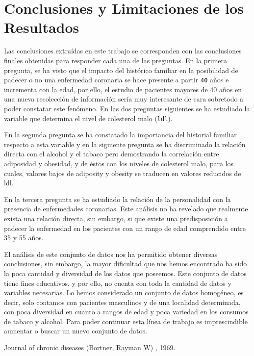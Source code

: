 \documentclass[a4paper, 9pt]{article}
\begin{document}
\vspace{5mm}

\section{Conclusiones y Limitaciones de los Resultados}

Las conclusiones extraídas en este trabajo se corresponden con las conclusiones finales obtenidas para responder cada una de las preguntas. En la primera pregunta, se ha visto que el impacto del histórico familiar en la posibilidad de padecer o no una enfermedad coronaria se hace presente a partir \texttt{40} años e incrementa con la edad, por ello, el estudio de pacientes mayores de 40 años en una nueva recolección de información sería muy interesante de cara sobretodo a poder constatar este fenómeno. En las dos preguntas siguientes se ha estudiado la variable que determina el nivel de colesterol malo (\texttt{ldl}). 

\vspace{3mm}

En la segunda pregunta se ha constatado la importancia del historial familiar respecto a esta variable y en la siguiente pregunta se ha discriminado la relación directa con el alcohol y el tabaco pero demostrando la correlación entre adiposidad y obesidad, y de éstos con los niveles de colesterol malo, para los cuales, valores bajos de adiposity y obesity se traducen en valores reducidos de ldl. 

\vspace{3mm}

En la tercera pregunta se ha estudiado la relación de la personalidad con la presencia de enfermedades coronarias. Este análisis no ha revelado que realmente exista una relación directa, sin embargo, si que existe una predisposición a padecer la enfermedad en los pacientes con un rango de edad comprendido entre 35 y 55 años.

\vspace{3mm}

El análisis de este conjunto de datos nos ha permitido obtener diversas conclusiones, sin embargo, la mayor dificultad que nos hemos encontrado ha sido la poca cantidad y diversidad de los datos que poseemos. Este conjunto de datos tiene fines educativos, y por ello, no cuenta con toda la cantidad de datos y variables necesarias. Lo hemos considerado un conjunto de datos homogéneo, es decir, solo contamos con pacientes masculinos y de una localidad determinada, con poca diversidad en cuanto a rangos de edad y poca variedad en los consumos de tabaco y alcohol. Para poder continuar esta línea de trabajo es imprescindible aumentar o buscar un nuevo conjunto de datos.

\begin{thebibliography}{9}
    Journal of chronic diseases (Bortner, Rayman W)
    , 1969.

\end{thebibliography}
\end{document}
